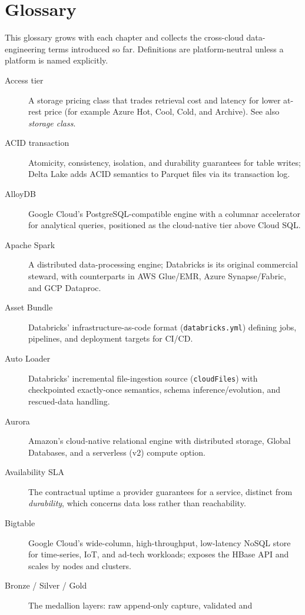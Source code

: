 \chapter*{Glossary}
%

This glossary grows with each chapter and collects the cross-cloud data-engineering terms
introduced so far. Definitions are platform-neutral unless a platform is named explicitly.

\begin{description}
  \item[Access tier] A storage pricing class that trades retrieval cost and latency for lower
    at-rest price (for example Azure Hot, Cool, Cold, and Archive). See also \emph{storage class}.
  \item[ACID transaction] Atomicity, consistency, isolation, and durability guarantees for table
    writes; Delta Lake adds ACID semantics to Parquet files via its transaction log.
  \item[AlloyDB] Google Cloud's PostgreSQL-compatible engine with a columnar accelerator for
    analytical queries, positioned as the cloud-native tier above Cloud SQL.
  \item[Apache Spark] A distributed data-processing engine; Databricks is its original commercial
    steward, with counterparts in AWS Glue/EMR, Azure Synapse/Fabric, and GCP Dataproc.
  \item[Asset Bundle] Databricks' infrastructure-as-code format (\texttt{databricks.yml}) defining
    jobs, pipelines, and deployment targets for CI/CD.
  \item[Auto Loader] Databricks' incremental file-ingestion source (\texttt{cloudFiles}) with
    checkpointed exactly-once semantics, schema inference/evolution, and rescued-data handling.
  \item[Aurora] Amazon's cloud-native relational engine with distributed storage, Global Databases,
    and a serverless (v2) compute option.
  \item[Availability SLA] The contractual uptime a provider guarantees for a service, distinct from
    \emph{durability}, which concerns data loss rather than reachability.
  \item[Bigtable] Google Cloud's wide-column, high-throughput, low-latency NoSQL store for
    time-series, IoT, and ad-tech workloads; exposes the HBase API and scales by nodes and clusters.
  \item[Bronze / Silver / Gold] The medallion layers: raw append-only capture, validated and

\end{description}
